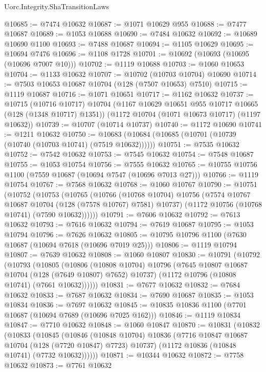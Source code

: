 \begin{lexlean}{Uorc.Integrity.ShaTransitionLaws}
\begin{coremodule}
@10685 := @7474 @10632
@10687 := @1071 @10629 @955
@10688 := @7477 @10687
@10689 := @1053 @10688
@10690 := @7484 @10632
@10692 := @10689 @10690 @1100
@10693 := @7488 @10687
@10694 := @1105 @10629
@10695 := @10694 @7476
@10696 := @1108 @1728
@10701 := @10692 (@10693 (@10695 (@10696 @7007 @10)))
@10702 := @1119 @10688
@10703 := @1060 @10653
@10704 := @1133 @10632
@10707 := @10702 (@10703 @10704) @10690
@10714 := @7503 @10653 @10687 @10704 (@128 (@7507 @10653) @7510)
@10715 := @1119 @10687
@10716 := @1071 @10651
@10717 := @1162 @10632
@10737 := @10715
    (@10716 @10717)
    @10704
    (@1167 @10629 @10651 @955 @10717 @10665 (@128 (@1348 @10717) @1351))
    (@1172 @10704 (@1071 @10673 @10717) (@1197 @10632))
@10739 := @10707 (@10714 @10737)
@10740 := @1172 @10690
@10741 := @1211 @10632
@10750 := @10683 (@10684 (@10685 (@10701 (@10739 (@10740 (@10703 @10741) (@7519 @10632))))))
@10751 := @7535 @10632
@10752 := @7542 @10632
@10753 := @7545 @10632
@10754 := @7548 @10687
@10755 := @1053 @10754
@10756 := @7555 @10632
@10765 := @10755 @10756 @1100 (@7559 @10687 (@10694 @7547 (@10696 @7013 @27)))
@10766 := @1119 @10754
@10767 := @7568 @10632
@10768 := @1060 @10767
@10790 := @10751
    (@10752
      (@10753
        (@10765
          (@10766
            (@10768 @10704)
            @10756
            (@7574 @10767 @10687 @10704 (@128 (@7578 @10767) @7581) @10737)
            (@1172 @10756 (@10768 @10741) (@7590 @10632))))))
@10791 := @7606 @10632
@10792 := @7613 @10632
@10793 := @7616 @10632
@10794 := @7619 @10687
@10795 := @1053 @10794
@10796 := @7626 @10632
@10805 := @10795 @10796 @1100 (@7630 @10687 (@10694 @7618 (@10696 @7019 @25)))
@10806 := @1119 @10794
@10807 := @7639 @10632
@10808 := @1060 @10807
@10830 := @10791
    (@10792
      (@10793
        (@10805
          (@10806
            (@10808 @10704)
            @10796
            (@7645 @10807 @10687 @10704 (@128 (@7649 @10807) @7652) @10737)
            (@1172 @10796 (@10808 @10741) (@7661 @10632))))))
@10831 := @7677 @10632
@10832 := @7684 @10632
@10833 := @7687 @10632
@10834 := @7690 @10687
@10835 := @1053 @10834
@10836 := @7697 @10632
@10845 := @10835 @10836 @1100 (@7701 @10687 (@10694 @7689 (@10696 @7025 @162)))
@10846 := @1119 @10834
@10847 := @7710 @10632
@10848 := @1060 @10847
@10870 := @10831
    (@10832
      (@10833
        (@10845
          (@10846
            (@10848 @10704)
            @10836
            (@7716 @10847 @10687 @10704 (@128 (@7720 @10847) @7723) @10737)
            (@1172 @10836 (@10848 @10741) (@7732 @10632))))))
@10871 := @10344 @10632
@10872 := @7758 @10632
@10873 := @7761 @10632

\end{coremodule}
\end{lexlean}

